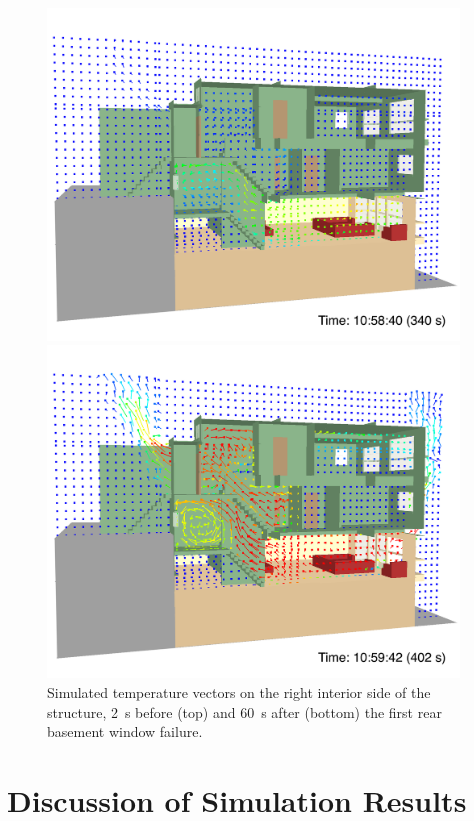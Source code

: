 \documentclass[12pt,oneside]{book}
\begin{document}
\begin{figure}[!ht]
\includegraphics[width=4.3in]{../Figures/SMV_Temp_Vec_340_s}


\includegraphics[width=4.3in]{../Figures/SMV_Temp_Vec_402_s}


\caption[Simulated temperature vectors on the right interior side of the structure.]
{Simulated temperature vectors on the right interior side of the structure, 2~s before (top) and 60~s after (bottom) the first rear basement window failure.}
\label{fig:smv_temperature_vectors}
\end{figure}


\chapter{Discussion of Simulation Results}
\label{sec:discussion}
\end{document}
